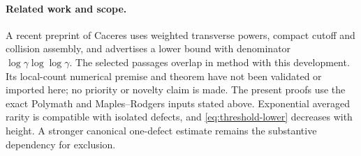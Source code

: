 \paragraph{Related work and scope.}
A recent preprint of Caceres \cite{Caceres2026Collision} uses weighted
transverse powers, compact cutoff and collision assembly, and advertises
a lower bound with denominator \(\log\gamma\log\log\gamma\).
The selected passages overlap in method with this development. Its
local-count numerical premise and theorem have not been validated or
imported here; no priority or novelty claim is made. The present proofs
use the exact Polymath and Maples--Rodgers inputs stated above.
Exponential averaged rarity is compatible with isolated defects, and
\eqref{eq:threshold-lower} decreases with height. A stronger canonical
one-defect estimate remains the substantive dependency for exclusion.
